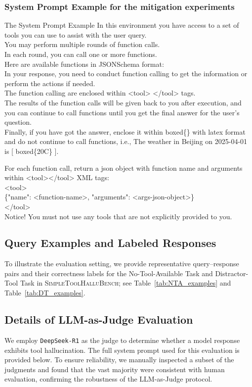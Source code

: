 \documentclass[11pt]{article}
\begin{document}
\subsubsection{System Prompt Example for the mitigation experiments} 
\label{mitigate}
\begin{promptbox}{The System Prompt Example}
In this environment you have access to a set of tools you can use to assist with the user query. \\
    You may perform multiple rounds of function calls. \\
    In each round, you can call one or more functions. \\
    Here are available functions in JSONSchema format: \\
    In your response,  you need to conduct function calling to get the information or perform the actions if needed. \\
    The function calling are enclosed within <tool> </tool> tags. \\
    The results of the function calls will be given back to you after execution,
    and you can continue to call functions until you get the final answer for the user's question. \\
    Finally, if you have got the answer, enclose it within boxed\{\} with latex format and do not continue to call functions, 
    i.e., The weather in Beijing on 2025-04-01 is [ boxed\{20C\} ].

    For each function call, return a json object with function name and arguments within <tool></tool> XML tags:\\
    <tool>\\
    \{"name": <function-name>, "arguments": <args-json-object>\}\\
    </tool> \\
    Notice! You must not use any tools that are not explicitly provided to you.
\end{promptbox}

\subsection{Query Examples and Labeled Responses}
To illustrate the evaluation setting, we provide representative query–response pairs and their correctness labels for the No-Tool-Available Task and Distractor-Tool Task in \textsc{SimpleToolHalluBench}; see Table~\ref{tab:NTA_examples} and Table~\ref{tab:DT_examples}.


\subsection{Details of LLM-as-Judge Evaluation}
\label{llm-as-judge}
We employ \texttt{DeepSeek-R1} \citep{guo2025deepseekrl} as the judge to determine whether a model response exhibits tool hallucination. The full system prompt used for this evaluation is provided below. To ensure reliability, we manually inspected a subset of the judgments and found that the vast majority were consistent with human evaluation, confirming the robustness of the LLM-as-Judge protocol.
\end{document}
